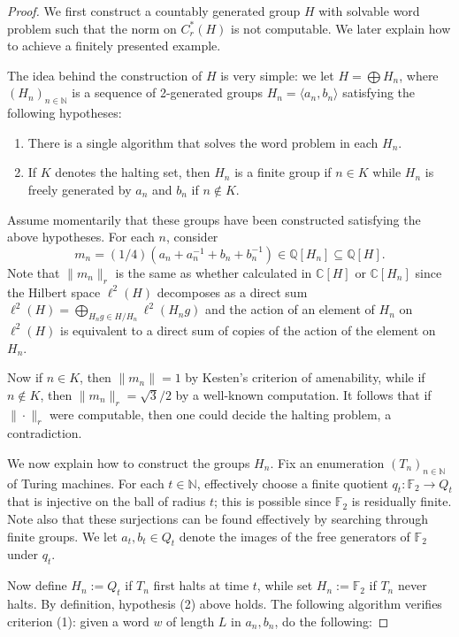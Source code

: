 \documentclass{amsart}
\newcommand{\N}{\mathbb{N}}
\theoremstyle{plain}
\theoremstyle{definition}
\numberwithin{equation}{section}
\begin{document}
\begin{proof}
We first construct a countably generated group $H$ with solvable word problem such that the norm on $C^*_r(H)$ is not computable.  We later explain how to achieve a finitely presented example.

The idea behind the construction of $H$ is very simple:  we let $H=\bigoplus H_n$, where $(H_n)_{n\in \N}$ is a sequence of 2-generated groups $H_n=\langle a_n,b_n\rangle$ satisfying the following hypotheses:
\begin{enumerate}
    \item There is a single algorithm that solves the word problem in each $H_n$.
    \item If $K$ denotes the halting set, then $H_n$ is a finite group if $n\in K$ while $H_n$ is freely generated by $a_n$ and $b_n$ if $n\notin K$.
\end{enumerate}

Assume momentarily that these groups have been constructed satisfying the above hypotheses.  For each $n$, consider $$m_n = (1/4)(a_n+a_n^{-1}+b_n+b_n^{-1}) \in \mathbb{Q}[H_n]\subseteq \mathbb{Q}[H].$$  Note that $\|m_n\|_r$ is the same as whether calculated in $\mathbb{C}[H]$ or $\mathbb{C}[H_n]$ since the Hilbert space $\ell^2(H)$ decomposes as a direct sum $\ell^2(H)=\bigoplus_{H_ng\in H/H_n} \ell^2(H_ng)$ and the action of an element of $H_n$ on $\ell^2(H)$ is equivalent to a direct sum of copies of the action of the element on $H_n$.

Now if $n\in K$, then $\|m_n\|=1$ by Kesten's criterion of amenability, while if $n\notin K$, then $\|m_n\|_r=\sqrt{3}/2$ by a well-known computation.  It follows that if $\|\cdot\|_r$ were computable, then one could decide the halting problem, a contradiction.

We now explain how to construct the groups $H_n$.  Fix an enumeration $(T_n)_{n\in \N}$ of Turing machines. For each $t\in \N$, effectively choose a finite quotient
$q_t : \mathbb{F}_2 \to Q_t$
that is injective on the ball of radius $t$; this is possible since $\mathbb{F}_2$ is residually finite.  Note also that these surjections can be found effectively by searching through finite groups. We let $a_t,b_t\in Q_t$ denote the images of the free generators of $\mathbb{F}_2$ under $q_t$.

Now define
$H_n:=Q_t$ if $T_n$ first halts at time $t$, while set  $H_n:=\mathbb{F}_2$ if $T_n$ never halts.  By definition, hypothesis (2) above holds.  The following algorithm verifies criterion (1):  given a word $w$ of length $L$ in $a_n,b_n$, do the following:


\end{proof}
\end{document}
